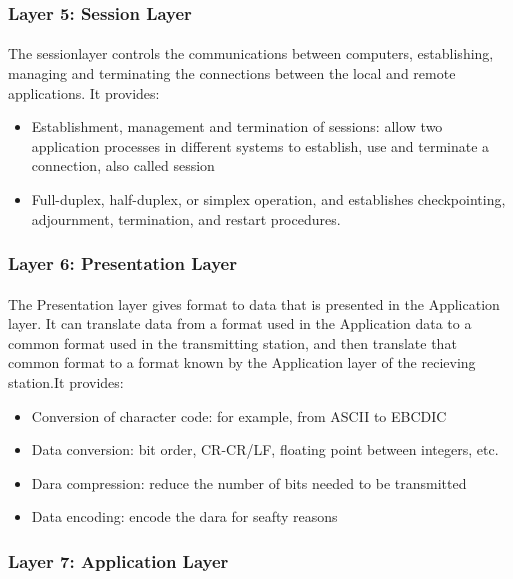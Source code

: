 \documentclass[12pt,a4paper]{report}
\begin{document}
\subsubsection{Layer 5: Session Layer}
\paragraph{}The sessionlayer controls the communications between computers, establishing, managing and terminating the connections between the local and remote applications. It provides:
\begin{itemize}
\item Establishment, management and termination of sessions: allow two application processes in different systems to establish, use and terminate a connection, also called session
\item  Full-duplex, half-duplex, or simplex operation, and establishes checkpointing, adjournment, termination, and restart procedures. 
\end{itemize}

\subsubsection{Layer 6: Presentation Layer}
\paragraph{}The Presentation layer gives format to data that is presented in the Application layer. It can translate data from a format used in the Application data to a common format used in the transmitting station, and then translate that common format to a format known by the Application layer of the recieving station.It provides:
\begin{itemize}
\item Conversion of character code: for example, from ASCII to EBCDIC
\item Data conversion: bit order, CR-CR/LF, floating point between integers, etc.
\item Dara compression: reduce the number of bits needed to be transmitted
\item Data encoding: encode the dara for seafty reasons
\end{itemize}

\subsubsection{Layer 7: Application Layer}
\end{document}
